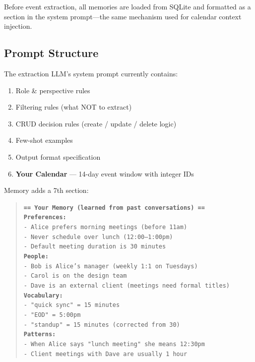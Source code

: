 \documentclass[11pt, letterpaper]{article}
\begin{document}
Before event extraction, all memories are loaded from SQLite and formatted as a
section in the system prompt---the same mechanism used for calendar context injection.

\subsection{Prompt Structure}

The extraction LLM's system prompt currently contains:

\begin{enumerate}[leftmargin=2em]
    \item Role \& perspective rules
    \item Filtering rules (what NOT to extract)
    \item CRUD decision rules (create / update / delete logic)
    \item Few-shot examples
    \item Output format specification
    \item \textbf{Your Calendar} --- 14-day event window with integer IDs
\end{enumerate}

\noindent Memory adds a 7th section:

\begin{quote}
\small
\texttt{\textbf{== Your Memory (learned from past conversations) ==}}\\[0.3em]
\texttt{\textbf{Preferences:}}\\
\texttt{- Alice prefers morning meetings (before 11am)}\\
\texttt{- Never schedule over lunch (12:00--1:00pm)}\\
\texttt{- Default meeting duration is 30 minutes}\\[0.3em]
\texttt{\textbf{People:}}\\
\texttt{- Bob is Alice's manager (weekly 1:1 on Tuesdays)}\\
\texttt{- Carol is on the design team}\\
\texttt{- Dave is an external client (meetings need formal titles)}\\[0.3em]
\texttt{\textbf{Vocabulary:}}\\
\texttt{- "quick sync" = 15 minutes}\\
\texttt{- "EOD" = 5:00pm}\\
\texttt{- "standup" = 15 minutes (corrected from 30)}\\[0.3em]
\texttt{\textbf{Patterns:}}\\
\texttt{- When Alice says "lunch meeting" she means 12:30pm}\\
\texttt{- Client meetings with Dave are usually 1 hour}
\end{quote}
\end{document}
